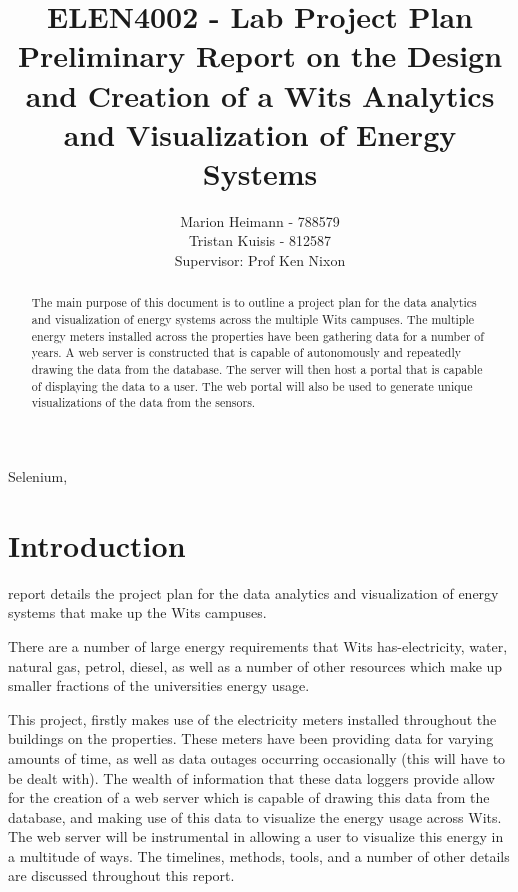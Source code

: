 \documentclass[12pt,onecolumn]{IEEEtran}
\begin{document}
\author{Marion Heimann - 788579 \\ Tristan Kuisis - 812587 \\ Supervisor: Prof Ken Nixon}
\title{ELEN4002 - Lab Project Plan \\ Preliminary Report on the Design and Creation of a Wits Analytics and Visualization of Energy Systems}
\maketitle
\begin{abstract}
    The main purpose of this document is to outline a project plan for the data analytics and visualization of energy systems across the multiple Wits campuses. The multiple energy meters installed across the properties have been gathering data for a number of years. A web server is constructed that is capable of autonomously and repeatedly drawing the data from the database. The server will then host a portal that is capable of displaying the data to a user. The web portal will also be used to generate unique visualizations of the data from the sensors.
\end{abstract}
\begin{IEEEkeywords} 
Selenium, 
\end{IEEEkeywords}
\pagestyle{plain}



\section{Introduction} \label{sec:Introduction}
 report details the project plan for the data analytics and visualization of energy systems that make up the Wits campuses. 

There are a number of large energy requirements that Wits has-electricity, water, natural gas, petrol, diesel, as well as a number of other resources which make up smaller fractions of the universities energy usage.

This project, firstly makes use of the electricity meters installed throughout the buildings on the properties. These meters have been providing data for varying amounts of time, as well as data outages occurring occasionally (this will have to be dealt with). 
The wealth of information that these data loggers provide allow for the creation of a web server which is capable of drawing this data from the database, and making use of this data to visualize the energy usage across Wits. The web server will be instrumental in allowing a user to visualize this energy in a multitude of ways. 
The timelines, methods, tools, and a number of other details are discussed throughout this report.
\end{document}
